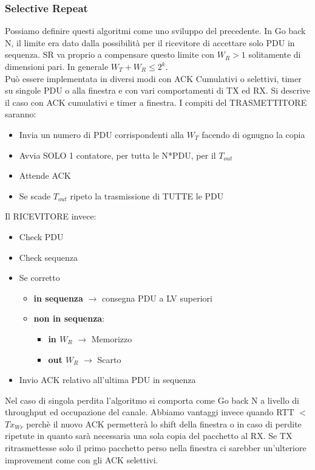 \documentclass[12pt]{article}
\begin{document}
\subsubsection{Selective Repeat}
Possiamo definire questi algoritmi come uno sviluppo del precedente. In Go back N, il limite era dato dalla possibilità per il ricevitore di accettare solo PDU in sequenza. SR va proprio a compensare questo limite con $W_{R}>1$ solitamente di dimensioni pari. In generale $W_{T}+W_{R}\leq2^k$.\\
Può essere implementata in diversi modi con ACK Cumulativi o selettivi, timer su singole PDU o alla finestra e con vari comportamenti di TX ed RX. Si descrive il caso con ACK cumulativi e timer a finestra.
I compiti del TRASMETTITORE saranno:
\begin{itemize}
  \item Invia un numero di PDU corrispondenti alla $W_{T}$ facendo di ognugno la copia
  \item Avvia SOLO 1 contatore, per tutta le N*PDU, per il $T_{out}$
  \item Attende ACK
  \item Se scade $T_{out}$ ripeto la trasmissione di TUTTE le PDU
\end{itemize}
Il RICEVITORE invece:
\begin{itemize}
  \item Check PDU
  \item Check sequenza
  \item Se corretto
  \begin{itemize}
    \item \textbf{in sequenza} $\rightarrow$ consegna PDU a LV superiori
    \item \textbf{non in sequenza}:
    \begin{itemize}
      \item \textbf{in $W_{R}$} $\rightarrow$ Memorizzo
      \item \textbf{out $W_{R}$} $\rightarrow$ Scarto
    \end{itemize}
  \end{itemize}
  \item Invio ACK relativo all'ultima PDU in sequenza
\end{itemize}
Nel caso di singola perdita l'algoritmo si comporta come Go back N a livello di throughput ed occupazione del canale. Abbiamo vantaggi invece quando RTT $<$ $Tx_{Wr}$ perchè il nuovo ACK permetterà lo shift della finestra o in caso di perdite ripetute in quanto sarà necessaria una sola copia del pacchetto al RX. Se TX ritrasmettesse solo il primo pacchetto perso nella finestra ci sarebber un'ulteriore improvement come con gli ACK selettivi.
\end{document}
